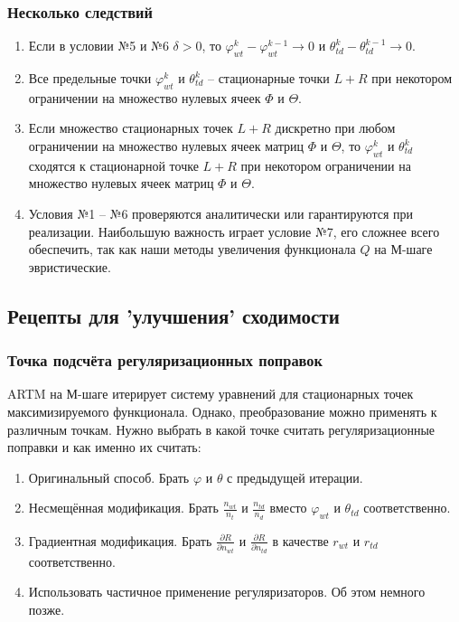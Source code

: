 \documentclass[utf8]{beamer}
\renewcommand{\phi}{\varphi}
\begin{document}
\begin{frame}
\frametitle{Несколько следствий}
\begin{enumerate}
\item  Если в условии №5 и №6 $\delta > 0$, то $\phi^k_{wt} - \phi_{wt}^{k-1} \to 0$ и $\theta^k_{td} - \theta^{k-1}_{td} \to 0$.
\item Все предельные точки $\phi^k_{wt}$ и $\theta^k_{td}$ -- стационарные точки $L + R$ при некотором ограничении на множество нулевых ячеек $\Phi$ и $\Theta$.
\item Если множество стационарных точек $L + R$ дискретно при любом ограничении на множество нулевых ячеек матриц $\Phi$ и $\Theta$, то $\phi_{wt}^k$ и $\theta_{td}^k$ сходятся к стационарной точке $L+R$ при некотором ограничении  на множество нулевых ячеек матриц $\Phi$ и $\Theta$.
\item Условия №1 -- №6 проверяются аналитически или гарантируются при реализации. Наибольшую важность играет условие №7, его сложнее всего обеспечить, так как наши методы увеличения функционала $Q$ на М-шаге эвристические.
\end{enumerate}
\end{frame}

	
\subsection{Рецепты для 'улучшения' сходимости}

\begin{frame}
\frametitle{Точка подсчёта регуляризационных поправок}
ARTM на М-шаге итерирует систему уравнений для стационарных точек максимизируемого функционала. Однако, преобразование можно применять к различным точкам. Нужно выбрать в какой точке считать регуляризационные поправки и как именно их считать:
\medskip

\begin{enumerate}
\item Оригинальный способ. Брать $\phi$ и $\theta$ с предыдущей итерации.
\item Несмещённая модификация. Брать $\frac{n_{wt}}{n_t}$ и $ \frac{n_{td}}{n_d}$ вместо $\phi_{wt}$ и $\theta_{td}$ соответственно.
\item Градиентная модификация. Брать $\frac{\partial{R}}{\partial{n_{wt}}} $ и $ \frac{\partial{R}}{\partial{n_{td}}}$ в качестве $r_{wt}$ и $r_{td}$ соответственно.
\item Использовать частичное применение регуляризаторов. Об этом немного позже.
\end{enumerate}
\end{frame}
	
\end{document}
